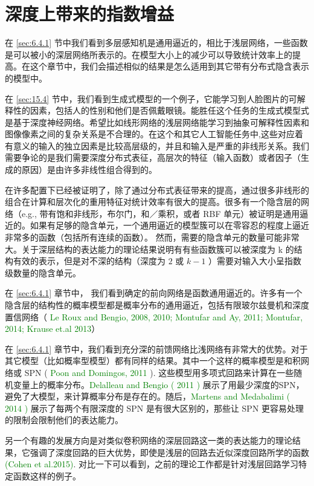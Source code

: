 \section{深度上带来的指数增益}
\label{sec;15.5}
在 \ref{sec:6.4.1} 节中我们看到多层感知机是通用逼近的，相比于浅层网络，一些函数是可以被小的深层网络所表示的。在模型大小上的减少可以导致统计效率上的提高。在这个章节中，我们会描述相似的结果是怎么适用到其它带有分布式隐含表示的模型中。

在 \ref{sec:15.4} 节中，我们看到生成式模型的一个例子，它能学习到人脸图片的可解释性的因素，包括人的性别和他们是否佩戴眼镜。能胜任这个任务的生成式模型式是基于深度神经网络。希望比如线形网络的浅层网络能学习到抽象可解释性因素和图像像素之间的复杂关系是不合理的。在这个和其它人工智能任务中,这些对应着有意义的输入的独立因素是比较高层级的，并且和输入是严重的非线形关系。我们需要争论的是我们需要深度分布式表征，高层次的特征（输入函数）或者因子（生成的原因）是由许多非线性组合得到的。

在许多配置下已经被证明了，除了通过分布式表征带来的提高，通过很多非线形的组合在计算和层次化的重用特征对统计效率有很大的提高。很多有一个隐含层的网络（e.g., 带有饱和非线形，布尔门，和／乘积，或者 RBF 单元）被证明是通用逼近的。如果有足够的隐含单元，一个通用逼近的模型簇可以在零容忍的程度上逼近非常多的函数（包括所有连续的函数）。 然而，需要的隐含单元的数量可能非常大。关于深层结构的表达能力的理论结果说明有有些函数簇可以被深度为 k 的结构有效的表示，但是对不深的结构（深度为 $2$ 或 $k-1$ ）需要对输入大小呈指数级数量的隐含单元。

在 \ref{sec:6.4.1} 章节中， 我们看到确定的前向网络是函数通用逼近的。许多有一个隐含层的结构性的概率模型都是概率分布的通用逼近，包括有限玻尔兹曼机和深度置信网络（ \textcolor{green}{Le Roux and Bengio, 2008, 2010; Montufar and Ay, 2011; Montufar, 2014; Krause et.al 2013}）

在 \ref{sec:6.4.1} 章节中，我们看到充分深的前馈网络比浅网络有非常大的优势。对于其它模型（比如概率型模型）都有同样的结果。其中一个这样的概率模型是和积网络或 SPN ( \textcolor{green}{Poon and Domingos, 2011} ).  这些模型用多项式回路来计算在一些随机变量上的概率分布。\textcolor{green}{Delalleau and Bengio ( 2011 )} 展示了用最少深度的SPN，避免了大模型，来计算概率分布是存在的。随后，\textcolor{green}{Martens and Medabalimi ( 2014 )} 展示了每两个有限深度的 SPN 是有很大区别的，那些让 SPN 更容易处理的限制会限制他们的表达能力。

另一个有趣的发展方向是对类似卷积网络的深层回路这一类的表达能力的理论结果，它强调了深度回路的巨大优势，即使是浅层的回路去近似深度回路所学的函数 \textcolor{green}{(Cohen et al.2015)}. 对比一下可以看到，之前的理论工作都是针对浅层回路学习特定函数这样的例子。











